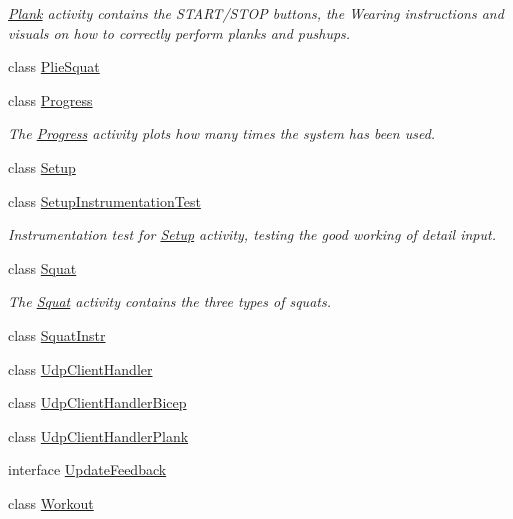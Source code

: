 \begin{DoxyCompactItemize}
\begin{DoxyCompactList}\small\item\em \mbox{\hyperlink{classcom_1_1example_1_1trainawearapplication_1_1_plank}{Plank}} activity contains the S\+T\+A\+R\+T/\+S\+T\+OP buttons, the Wearing instructions and visuals on how to correctly perform planks and pushups. \end{DoxyCompactList}\item 
class \mbox{\hyperlink{classcom_1_1example_1_1trainawearapplication_1_1_plie_squat}{Plie\+Squat}}
\item 
class \mbox{\hyperlink{classcom_1_1example_1_1trainawearapplication_1_1_progress}{Progress}}
\begin{DoxyCompactList}\small\item\em The \mbox{\hyperlink{classcom_1_1example_1_1trainawearapplication_1_1_progress}{Progress}} activity plots how many times the system has been used. \end{DoxyCompactList}\item 
class \mbox{\hyperlink{classcom_1_1example_1_1trainawearapplication_1_1_setup}{Setup}}
\item 
class \mbox{\hyperlink{classcom_1_1example_1_1trainawearapplication_1_1_setup_instrumentation_test}{Setup\+Instrumentation\+Test}}
\begin{DoxyCompactList}\small\item\em Instrumentation test for \mbox{\hyperlink{classcom_1_1example_1_1trainawearapplication_1_1_setup}{Setup}} activity, testing the good working of detail input. \end{DoxyCompactList}\item 
class \mbox{\hyperlink{classcom_1_1example_1_1trainawearapplication_1_1_squat}{Squat}}
\begin{DoxyCompactList}\small\item\em The \mbox{\hyperlink{classcom_1_1example_1_1trainawearapplication_1_1_squat}{Squat}} activity contains the three types of squats. \end{DoxyCompactList}\item 
class \mbox{\hyperlink{classcom_1_1example_1_1trainawearapplication_1_1_squat_instr}{Squat\+Instr}}
\item 
class \mbox{\hyperlink{classcom_1_1example_1_1trainawearapplication_1_1_udp_client_handler}{Udp\+Client\+Handler}}
\item 
class \mbox{\hyperlink{classcom_1_1example_1_1trainawearapplication_1_1_udp_client_handler_bicep}{Udp\+Client\+Handler\+Bicep}}
\item 
class \mbox{\hyperlink{classcom_1_1example_1_1trainawearapplication_1_1_udp_client_handler_plank}{Udp\+Client\+Handler\+Plank}}
\item 
interface \mbox{\hyperlink{interfacecom_1_1example_1_1trainawearapplication_1_1_update_feedback}{Update\+Feedback}}
\item 
class \mbox{\hyperlink{classcom_1_1example_1_1trainawearapplication_1_1_workout}{Workout}}
\end{DoxyCompactItemize}
